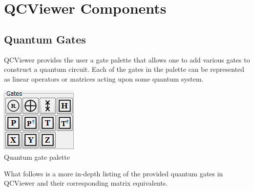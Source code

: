 \documentclass[10pt]{article}
\theoremstyle{definition}
\begin{document}
\section{QCViewer Components}\label{sec:QCViewerComponents}

\subsection{Quantum Gates} \label{sub:QuantumGates}

QCViewer provides the user a gate palette that allows one to add various gates to construct a quantum circuit. Each of the gates in the palette can be represented as linear operators or matrices acting upon some quantum system. 

\begin{center}
\includegraphics{Figures/Gates/Gates.png}\\
Quantum gate palette
\end{center}

What follows is a more in-depth listing of the provided quantum gates in QCViewer and their corresponding matrix equivalents. 
\end{document}
